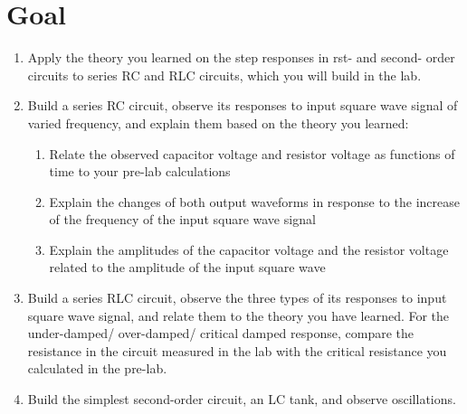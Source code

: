 \documentclass{article}
\begin{document}
\newpage





\section{Goal}

\begin{enumerate}

\item

Apply the theory you learned on the step responses in 
rst- and second- order circuits to series RC and RLC circuits, which you will build in the lab.

\item
Build a series RC circuit, observe its responses to input square wave signal of varied frequency, and explain them based on the theory you learned:

\begin{enumerate}[$\bullet$]

\item

Relate the observed capacitor voltage and resistor voltage as functions of time to your pre-lab calculations

\item

Explain the changes of both output waveforms in response to the increase of the frequency of the input square wave signal

\item

Explain the amplitudes of the capacitor voltage and the resistor voltage related to the amplitude of the input square wave

\end{enumerate}

\item

Build a series RLC circuit, observe the three types of its responses to input square wave signal, and relate them to the theory you have learned. For the under-damped/ over-damped/ critical damped response, compare the resistance in the circuit measured in the lab with the critical resistance you calculated in the pre-lab.

\item

Build the simplest second-order circuit, an LC tank, and observe oscillations.

\end{enumerate}
\end{document}
